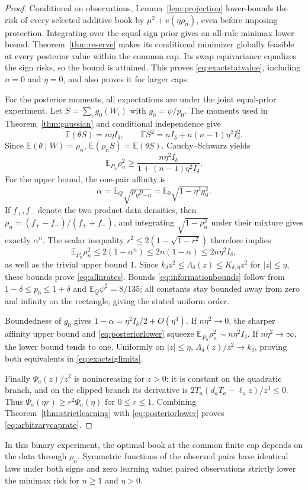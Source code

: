 \documentclass[11pt,a4paper]{amsart}
\theoremstyle{plain}
\theoremstyle{definition}
\theoremstyle{remark}
\newcommand{\EE}{\mathbb{E}}
\newcommand{\Ebar}{\EE_{\overline P_n}}
\begin{document}
\begin{proof}
Conditional on observations, Lemma~\ref{lem:projection} lower-bounds the risk of every selected additive book by $\mu^2+v(\eta\rho_n)$, even before imposing protection. Integrating over the equal sign prior gives an all-rule minimax lower bound. Theorem~\ref{thm:reserve} makes its conditional minimizer globally feasible at every posterior value within the common cap. Its swap equivariance equalizes the sign risks, so the bound is attained. This proves \eqref{eq:exactstatvalue}, including $n=0$ and $\eta=0$, and also proves it for larger caps.

For the posterior moments, all expectations are under the joint equal-prior experiment. Let $S=\sum_i g_0(W_i)$ with $g_0=\psi/p_0$. The moments used in Theorem~\ref{thm:gaussian} and conditional independence give
\[
 \EE(\theta S)=n\eta I_\delta,\qquad
 \EE S^2=n I_\delta+n(n-1)\eta^2I_\delta^2.
\]
Since $\EE(\theta\mid W)=\rho_n$, $\EE(\rho_nS)=\EE(\theta S)$. Cauchy--Schwarz yields
\begin{equation}\label{eq:posteriorlower}
 \Ebar\rho_n^2\ge\frac{n\eta^2I_\delta}{1+(n-1)\eta^2 I_\delta}.
\end{equation}
For the upper bound, the one-pair affinity is
\[
 \alpha=\EE_Q\sqrt{p_\eta p_{-\eta}}
        =\EE_0\sqrt{1-\eta^2g_0^2}.
\]
If $f_+,f_-$ denote the two product data densities, then
$\rho_n=(f_+-f_-)/(f_++f_-)$, and integrating
$\sqrt{1-\rho_n^2}$ under their mixture gives exactly $\alpha^n$.
The scalar inequality $r^2\le2(1-\sqrt{1-r^2})$ therefore implies
\[
 \Ebar\rho_n^2\le2(1-\alpha^n)\le2n(1-\alpha)
 \le2n\eta^2 I_\delta,
\]
as well as the trivial upper bound $1$. Since
$k_\delta z^2\le\Lambda_\delta(z)\le K_{\delta,\eta}z^2$ for $|z|\le\eta$, these bounds prove \eqref{eq:allnrates}. Bounds \eqref{eq:informationbounds} follow from $1-\delta\le p_0\le1+\delta$ and $\EE_Q\psi^2=8/135$; all constants stay bounded away from zero and infinity on the rectangle, giving the stated uniform order.

Boundedness of $g_0$ gives $1-\alpha=\eta^2I_\delta/2+O(\eta^4)$. If $n\eta^2\to0$, the sharper affinity upper bound and \eqref{eq:posteriorlower} squeeze $\Ebar\rho_n^2\sim n\eta^2 I_\delta$. If $n\eta^2\to\infty$, the lower bound tends to one. Uniformly on $|z|\le\eta$, $\Lambda_\delta(z)/z^2\to k_\delta$, proving both equivalents in \eqref{eq:exactsiglimits}.

Finally $\Psi_a(z)/z^2$ is nonincreasing for $z>0$: it is constant on the quadratic branch, and on the clipped branch its derivative is
$2T_a(d_aT_a-\ell_a z)/z^3\le0$.
Thus $\Psi_a(\eta r)\ge r^2\Psi_a(\eta)$ for $0\le r\le1$. Combining Theorem~\ref{thm:strictlearning} with \eqref{eq:posteriorlower} proves \eqref{eq:arbitrarycaprate}.
\end{proof}
In this binary experiment, the optimal book at the common finite cap depends on the data through $\rho_n$. Symmetric functions of the observed pairs have identical laws under both signs and zero learning value; paired observations strictly lower the minimax risk for $n\ge1$ and $\eta>0$.
\end{document}
